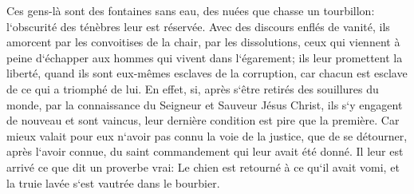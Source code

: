 \verse Ces gens-là sont des fontaines sans eau, des nuées que chasse un tourbillon: l`obscurité des ténèbres leur est réservée. 
\verse Avec des discours enflés de vanité, ils amorcent par les convoitises de la chair, par les dissolutions, ceux qui viennent à peine d`échapper aux hommes qui vivent dans l`égarement; 
\verse ils leur promettent la liberté, quand ils sont eux-mêmes esclaves de la corruption, car chacun est esclave de ce qui a triomphé de lui. 
\verse En effet, si, après s`être retirés des souillures du monde, par la connaissance du Seigneur et Sauveur Jésus Christ, ils s`y engagent de nouveau et sont vaincus, leur dernière condition est pire que la première. 
\verse Car mieux valait pour eux n`avoir pas connu la voie de la justice, que de se détourner, après l`avoir connue, du saint commandement qui leur avait été donné. 
\verse Il leur est arrivé ce que dit un proverbe vrai: Le chien est retourné à ce qu`il avait vomi, et la truie lavée s`est vautrée dans le bourbier. 

\chapter{}

